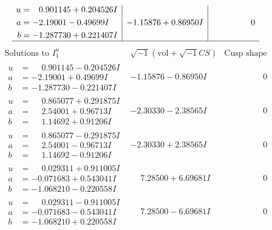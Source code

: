 \documentclass[1p]{elsarticle_modified}
\theoremstyle{definition}
\newcommand{\I}{\sqrt{-1}}
\begin{document}
$$\begin{array}{c|c|c}
\begin{aligned}
u &= \phantom{-}0.901145 + 0.204526 I \\
a &= -2.19001 - 0.49699 I \\
b &= -1.287730 + 0.221407 I\end{aligned}
 & -1.15876 + 0.86950 I & \phantom{-0.000000 } 0\\
 \hline 
 \end{array}$$\newpage$$\begin{array}{c|c|c}  
\text{Solutions to }I^u_{1}& \I (\text{vol} + \sqrt{-1}CS) & \text{Cusp shape}\\
 \hline 
\begin{aligned}
u &= \phantom{-}0.901145 - 0.204526 I \\
a &= -2.19001 + 0.49699 I \\
b &= -1.287730 - 0.221407 I\end{aligned}
 & -1.15876 - 0.86950 I & \phantom{-0.000000 } 0 \\ \hline\begin{aligned}
u &= \phantom{-}0.865077 + 0.291875 I \\
a &= \phantom{-}2.54001 + 0.96713 I \\
b &= \phantom{-}1.14692 + 0.91206 I\end{aligned}
 & -2.30330 - 2.38565 I & \phantom{-0.000000 } 0 \\ \hline\begin{aligned}
u &= \phantom{-}0.865077 - 0.291875 I \\
a &= \phantom{-}2.54001 - 0.96713 I \\
b &= \phantom{-}1.14692 - 0.91206 I\end{aligned}
 & -2.30330 + 2.38565 I & \phantom{-0.000000 } 0 \\ \hline\begin{aligned}
u &= \phantom{-}0.029311 + 0.911005 I \\
a &= -0.071683 + 0.543041 I \\
b &= -1.068210 - 0.220558 I\end{aligned}
 & \phantom{-}7.28500 + 6.69681 I & \phantom{-0.000000 } 0 \\ \hline\begin{aligned}
u &= \phantom{-}0.029311 - 0.911005 I \\
a &= -0.071683 - 0.543041 I \\
b &= -1.068210 + 0.220558 I\end{aligned}
 & \phantom{-}7.28500 - 6.69681 I & \phantom{-0.000000 } 0 \\ \hline\begin{aligned}

\end{aligned}
\end{array}$$
\end{document}

